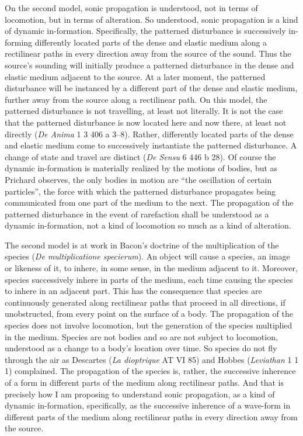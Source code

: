 \documentclass[12pt]{article}
\begin{document}
On the second model, sonic propagation is understood, not in terms of locomotion, but in terms of alteration. So understood, sonic propagation is a kind of dynamic in-formation. Specifically, the patterned disturbance is successively in-forming differently located parts of the dense and elastic medium along a rectilinear paths in every direction away from the source of the sound. Thus the source's sounding will initially produce a patterned disturbance in the dense and elastic medium adjacent to the source. At a later moment, the patterned disturbance will be instanced by a different part of the dense and elastic medium, further away from the source along a rectilinear path. On this model, the patterned disturbance is not travelling, at least not literally. It is not the case that the patterned disturbance is now located here and now there, at least not directly (\emph{De Anima} 1 3 406 a 3--8). Rather, differently located parts of the dense and elastic medium come to successively instantiate the patterned disturbance. A change of state and travel are distinct (\emph{De Sensu} 6 446 b 28). Of course the dynamic in-formation is materially realized by the motions of bodies, but as Prichard observes, the only bodies in motion are ``the oscillation of certain particles'', the force with which the patterned disturbance propagates being communicated from one part of the medium to the next. The propagation of the patterned disturbance in the event of rarefaction shall be understood as a dynamic in-formation, not a kind of locomotion so much as a kind of alteration.

The second model is at work in Bacon's doctrine of the multiplication of the species (\emph{De multiplicatione specierum}). An object will cause a species, an image or likeness of it, to inhere, in some sense, in the medium adjacent to it. Moreover, species successively inhere in parts of the medium, each time causing the species to inhere in an adjacent part. This has the consequence that species are continuously generated along rectilinear paths that proceed in all directions, if unobstructed, from every point on the surface of a body. The propagation of the species does not involve locomotion, but the generation of the species multiplied in the medium. Species are not bodies and so are not subject to locomotion, understood as a change to a body’s location over time. So species do not fly through the air as Descartes (\emph{La dioptrique} AT VI 85) and Hobbes (\emph{Leviathan} 1 1 1) complained. The propagation of the species is, rather, the successive inherence of a form in different parts of the medium along rectilinear paths. And that is precisely how I am proposing to understand sonic propagation, as a kind of dynamic in-formation, specifically, as the successive inherence of a wave-form in different parts of the medium along rectilinear paths in every direction away from the source.
\end{document}
